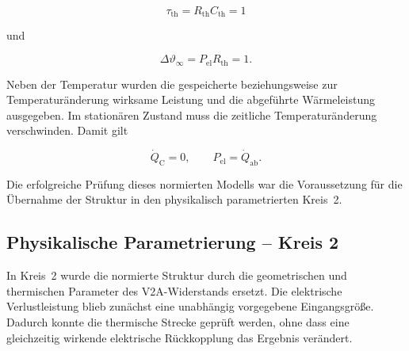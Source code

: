 \begin{equation}
    \tau_\mathrm{th}=R_\mathrm{th}C_\mathrm{th}=1
    \label{eq:kap5_kreis1_tau}
\end{equation}

und

\begin{equation}
    \Delta\vartheta_\infty
    =
    P_\mathrm{el}R_\mathrm{th}
    =1.
    \label{eq:kap5_kreis1_endwert}
\end{equation}

Neben der Temperatur wurden die gespeicherte beziehungsweise zur
Temperaturänderung wirksame Leistung und die abgeführte Wärmeleistung
ausgegeben. Im stationären Zustand muss die zeitliche Temperaturänderung
verschwinden. Damit gilt

\begin{equation}
    \dot Q_\mathrm{C}=0,
    \qquad
    P_\mathrm{el}=\dot Q_\mathrm{ab}.
    \label{eq:kap5_kreis1_stationaer}
\end{equation}


Die erfolgreiche Prüfung dieses normierten Modells war die Voraussetzung für
die Übernahme der Struktur in den physikalisch parametrierten Kreis~2.



\subsection{Physikalische Parametrierung -- Kreis 2}
\label{sec:thermisches_modell_kreis2}

In Kreis~2 wurde die normierte Struktur durch die geometrischen und
thermischen Parameter des V2A-Widerstands ersetzt. Die elektrische
Verlustleistung blieb zunächst eine unabhängig vorgegebene Eingangsgröße.
Dadurch konnte die thermische Strecke geprüft werden, ohne dass eine
gleichzeitig wirkende elektrische Rückkopplung das Ergebnis verändert.

